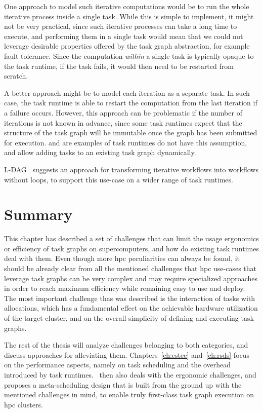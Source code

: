 \begin{description}[wide=0pt]
		One approach to model such iterative computations would be to run the whole iterative process
		inside a single task. While this is simple to implement, it might not be very practical, since such
		iterative processes can take a long time to execute, and performing them in a single task would
		mean that we could not leverage desirable properties offered by the task graph abstraction, for
		example fault tolerance. Since the computation \emph{within} a single task is typically
		opaque to the task runtime, if the task fails, it would then need to be restarted from scratch.

		A better approach might be to model each iteration as a separate task. In such case, the task
		runtime is able to restart the computation from the last iteration if a failure occurs. However,
		this approach can be problematic if the number of iterations is not known in advance, since some
		task runtimes expect that the structure of the task graph will be immutable once the graph has been
		submitted for execution. \dask{} and \ray{} are examples of task
		runtimes do not have this assumption, and allow adding tasks to an existing task graph dynamically.

		\textsc{L-DAG}~\cite{l-dag} suggests an approach for
		transforming iterative workflows into workflows without loops, to support this use-case on a wider
		range of task runtimes.
\end{description}

\section*{Summary}
This chapter has described a set of challenges that can limit the usage ergonomics or efficiency of
task graphs on supercomputers, and how do existing task runtimes deal with them. Even though more
\gls{hpc} peculiarities can always be found, it should be already clear from all the
mentioned challenges that \gls{hpc} use-cases that leverage task graphs can be very
complex and may require specialized approaches in order to reach maximum efficiency while remaining
easy to use and deploy. The most important challenge thas was described is the interaction of tasks
with allocations, which has a fundamental effect on the achievable hardware utilization of the
target cluster, and on the overall simplicity of defining and executing task graphs.

The rest of the thesis will analyze challenges belonging to both categories, and discuss approaches
for alleviating them. Chapters~\ref{ch:estee} and~\ref{ch:rsds} focus on the
performance aspects, namely on task scheduling and the overhead introduced by task
runtimes.~ then also deals with the ergonomic challenges, and proposes a
meta-scheduling design that is built from the ground up with the mentioned challenges in mind, to
enable truly first-class task graph execution on \gls{hpc} clusters.
